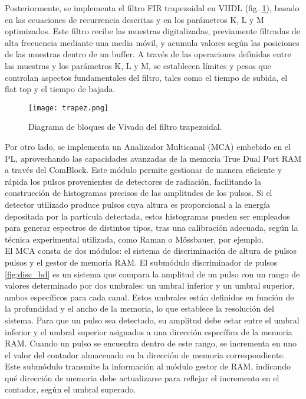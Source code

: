 \documentclass{report}
\begin{document}
\noindent Posteriormente, se implementa el filtro FIR trapezoidal en VHDL (fig. \ref{fig:trapez_bd}), basado en las ecuaciones de recurrencia descritas y en los parámetros K, L y M optimizados. Este filtro recibe las muestras digitalizadas, previamente filtradas de alta frecuencia mediante una media móvil, y acumula valores según las posiciones de las muestras dentro de un buffer. A través de las operaciones definidas entre las muestras y los parámetros K, L y M, se establecen límites y pesos que controlan aspectos fundamentales del filtro, tales como el tiempo de subida, el flat top y el tiempo de bajada.

\begin{figure}[h]
    \centering
    \texttt{[image: trapez.png]}
    \caption{Diagrama de bloques de Vivado del filtro trapezoidal.}
    \label{fig:trapez_bd}
\end{figure}

\noindent Por otro lado, se implementa un Analizador Multicanal (MCA) embebido en el PL, aprovechando las capacidades avanzadas de la memoria True Dual Port RAM a través del ComBlock. Este módulo permite gestionar de manera eficiente y rápida los pulsos provenientes de detectores de radiación, facilitando la construcción de histogramas precisos de las amplitudes de los pulsos. Si el detector utilizado produce pulsos cuya altura es proporcional a la energía depositada por la partícula detectada, estos histogramas pueden ser empleados para generar espectros de distintos tipos, tras una calibración adecuada, según la técnica experimental utilizada, como Raman o Mössbauer, por ejemplo.\\

\noindent El MCA consta de dos módulos: el sistema de discriminación de altura de pulsos pulsos y el gestor de memoria RAM. El submódulo discriminador de pulsos \ref{fig:disc_bd} es un sistema que compara la amplitud de un pulso con un rango de valores determinado por dos umbrales: un umbral inferior y un umbral superior, ambos específicos para cada canal. Estos umbrales están definidos en función de la profundidad y el ancho de la memoria, lo que establece la resolución del sistema. Para que un pulso sea detectado, su amplitud debe estar entre el umbral inferior y el umbral superior asignados a una dirección específica de la memoria RAM. Cuando un pulso se encuentra dentro de este rango, se incrementa en uno el valor del contador almacenado en la dirección de memoria correspondiente. Este submódulo transmite la información al módulo gestor de RAM, indicando qué dirección de memoria debe actualizarse para reflejar el incremento en el contador, según el umbral superado.\\
\end{document}
